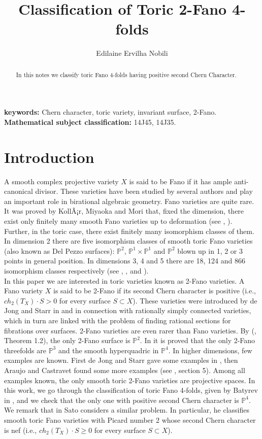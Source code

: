\documentclass[10pt]{article}
\title{Classification of Toric 2-Fano 4-folds}
\author{Edilaine Ervilha Nobili}
\date{}
\begin{document}
\maketitle
 
\begin{abstract} In this notes we classify toric Fano 4-folds having positive second Chern Character. 
\end{abstract}
\textbf{keywords:} Chern character, toric variety, invariant surface, 2-Fano.\\
\textbf{Mathematical subject classification:} 14J45, 14J35.

\section{Introduction}
 A smooth complex projective variety $X$ is said to be Fano if it has ample anti-canonical divisor. These varieties have been studied by several authors and play an important role in birational algebraic geometry. Fano varieties are quite rare. It was proved by KollÃ¡r, Miyaoka and Mori that, fixed the dimension, there exist only finitely many smooth Fano varieties up to deformation  (see \cite{kollar}, \cite{kol}). Further, in the toric case, there exist finitely many isomorphism classes of them. In dimension 2 there are five isomorphism classes of smooth toric Fano varieties  (also known as Del Pezzo surfaces): $\mathbb{P}^2$, $\mathbb{P}^1 \times \mathbb{P}^1$ and $\mathbb{P}^2$ blown up in 1, 2 or 3 points in general position. In dimensions 3, 4 and 5 there are 18, 124 and 866 isomorphism classes respectively (see \cite{bat3}, \cite{bat}, and \cite{nill}).\\
 
  In this paper we are interested in toric varieties known as 2-Fano varieties. A Fano variety $X$ is said to be 2-Fano if its second Chern character is positive (i.e., $ch_2(T_X)\cdot S >0$ for every surface $S\subset X$). These varieties were introduced by de Jong and Starr in \cite{starr} and \cite{jason} in connection with rationally simply connected varieties, which in turn are linked with the problem of finding rational sections for fibrations over surfaces. 2-Fano varieties are even rarer than Fano varieties. By (\cite{jason}, Theorem 1.2), the only 2-Fano surface is $\mathbb{P}^2$. In \cite{carol} it is proved that the only 2-Fano threefolds are $\mathbb{P}^3$ and the smooth hyperquadric in $\mathbb{P}^4$. In higher dimensions, few examples are known. First de Jong and Starr gave some examples in \cite{jason}, then Araujo and Castravet found some more examples (see \cite{ana}, section 5). Among all examples known, the only smooth toric 2-Fano varieties are projective spaces. 
  In this work, we go through the classification of toric Fano 4-folds, given by Batyrev in \cite{bat}, and we check that the only one with positive second Chern character is $\mathbb{P}^4$. We remark that in  \cite{sato2} Sato considers a similar problem. In particular, he classifies smooth toric Fano varieties with Picard number 2 whose second Chern character is nef (i.e., $ch_2(T_X)\cdot S \geq 0$ for every surface $S\subset X$).\\
\end{document}
